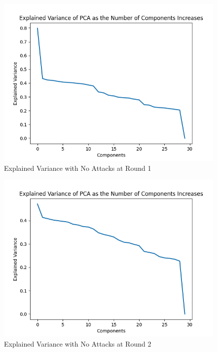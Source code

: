 \begin{figure}[htbp]
	\centering
    \includegraphics[scale=0.5]{my_agg/graphs/0_r1.png}
	\caption{Explained Variance with No Attacks at Round 1}
	\label{fig:pca_01}
\end{figure}

\begin{figure}[htbp]
	\centering
    \includegraphics[scale=0.5]{my_agg/graphs/0_r2.png}
	\caption{Explained Variance with No Attacks at Round 2}
	\label{fig:pca_02}
\end{figure}

